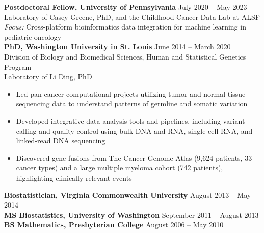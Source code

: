 \documentclass[11pt]{article}
\begin{document}
\textbf{Postdoctoral Fellow, University of Pennsylvania} \hfill July 2020 -- May 2023 \\
Laboratory of Casey Greene, PhD, and the Childhood Cancer Data Lab at ALSF \\
\emph{Focus:} Cross-platform bioinformatics data integration for machine learning in pediatric oncology \\

\textbf{PhD, Washington University in St. Louis} \hfill June 2014 -- March 2020 \\
Division of Biology and Biomedical Sciences, Human and Statistical Genetics Program \\
Laboratory of Li Ding, PhD

\begin{itemize}
  \item Led pan-cancer computational projects utilizing tumor and normal tissue sequencing data to understand patterns of germline and somatic variation
  \item Developed integrative data analysis tools and pipelines, including variant calling and quality control using bulk DNA and RNA, single-cell RNA, and linked-read DNA sequencing
  \item Discovered gene fusions from The Cancer Genome Atlas (9,624 patients, 33 cancer types) and a large multiple myeloma cohort (742 patients), highlighting clinically-relevant events
\end{itemize}

\textbf{Biostatistician, Virginia Commonwealth University} \hfill August 2013 -- May 2014 \\
\textbf{MS Biostatistics, University of Washington} \hfill September 2011 -- August 2013 \\
\textbf{BS Mathematics, Presbyterian College} \hfill August 2006 -- May 2010
\end{document}
